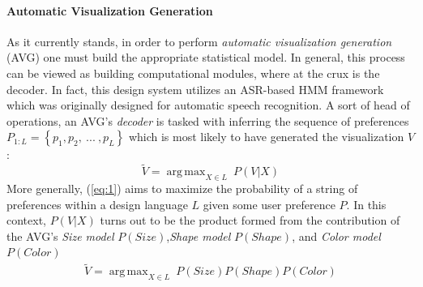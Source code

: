 \documentclass{evolang12}
\DeclareMathOperator*{\argmax}{arg\,max}
\begin{document}
\paragraph{Automatic Visualization Generation}
As it currently stands, in order to perform \textit{automatic visualization generation} (AVG) one must build the appropriate statistical model. In general, this process can be viewed as building computational modules, where at the crux is the decoder. In fact, this design system utilizes an ASR-based HMM framework \cite{gales2008application,young2002htk} which was originally designed for automatic speech recognition. A sort of head of operations, an AVG's \textit{decoder} is tasked with inferring the sequence of preferences $P_{1:L} = \left\{p_{1},p_{2}, \ ...\ ,p_{L}\right\}$ which is most likely to have generated the visualization $V$:
\begin{equation} \label{eq:1}
\widetilde{V} = \argmax_{X \in L}\ P(V | X)
\end{equation}
\noindent More generally, (\ref{eq:1}) aims to maximize the probability of a string of preferences within a design language $L$ given some user preference $P$. In this context, $P(V|X)$ turns out to be the product formed from the contribution of the AVG's \textit{Size model} $P(Size)$,\textit{Shape model} $P(Shape)$, and \textit{Color model} $P(Color)$
\begin{align}
\widetilde{V} = \argmax_{X \in L}\ P(Size)P(Shape)P(Color)
\end{align}

\end{document}
